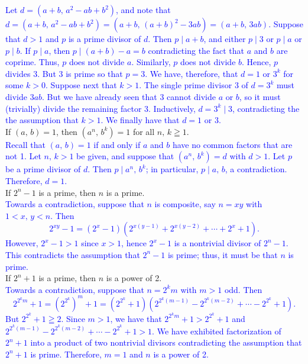 \documentclass[a4paper,11pt]{article}
\theoremstyle{mythm}
\theoremstyle{mydef}
\newcommand{\blue}[1]{\textcolor{blue}{#1}}
\begin{document}
\blue{Let $d=(a+b,\,a^2-ab+b^2)$, and note that
$d=(a+b,\,a^2-ab+b^2)=(a+b,\,(a+b)^2-3ab)=(a+b,\,3ab)$. Suppose that $d>1$ and
$p$ is a prime divisor of $d$. Then $p \mid a+b$, and either $p \mid 3$ or $p
\mid a$ or $p \mid b$. If $p \mid a$, then $p \mid (a+b)-a=b$ contradicting the
fact that $a$ and $b$ are coprime. Thus, $p$ does not divide $a$. Similarly, $p$
does not divide $b$. Hence, $p$ divides 3. But 3 is prime so that $p=3$. We
have, therefore, that $d=1 \text{ or }3^k$ for some $k>0$. Suppose next that
$k>1$. The single prime divisor 3 of $d=3^k$ must divide $3ab$. But we have
already seen that 3 cannot divide $a$ or $b$, so it must (trivially) divide the
remaining factor 3. Inductively, $d=3^k \mid 3$, contradicting the the
assumption that $k>1$. We finally have that $d=1\text{ or }3$.} \\

 If $(a,\,b)=1$, then $(a^n,\,b^k)=1$ for all $n,\,k
\geqq 1$. \\

\blue{Recall that $(a,\,b)=1$ if and only if $a$ and $b$ have no common factors
that are not 1. Let $n,\,k > 1$ be given, and suppose that $(a^n,\,b^k)=d$ with
$d > 1$. Let $p$ be a prime divisor of $d$. Then $p \mid a^n,\,b^k$; in
particular, $p \mid a,\,b$, a contradiction. Therefore, $d=1$.} \\

 If $2^n-1$ is a prime, then $n$ is a prime. \\

\blue{Towards a contradiction, suppose that $n$ is composite, say $n=xy$ with
  $1<x,\,y<n$. Then
  \[
    2^{xy}-1 = (2^x-1)(2^{x(y-1)}+2^{x(y-2)}+\cdots+2^x+1).
  \]
  However, $2^x-1 > 1$ since $x>1$, hence $2^x-1$ is a nontrivial divisor of
  $2^n-1$. This contradicts the assumption that $2^n-1$ is prime; thus, it must be
  that $n$ is prime.} \\

 If $2^n+1$ is a prime, then $n$ is a power of 2. \\

\blue{Towards a contradiction, suppose that $n=2^km$ with $m>1$ odd. Then
  \[
    2^{2^km}+1=(2^{2^k})^m+1 = (2^{2^k}+1)(2^{2^k(m-1)}-2^{2^k(m-2)}+\cdots-2^{2^k}+1).
  \]
  But $2^{2^k}+1 \geqq 2$. Since $m>1$, we have that $2^{2^km}+1 > 2^{2^k}+1$
and $2^{2^k(m-1)}-2^{2^k(m-2)}+\cdots-2^{2^k}+1 > 1$. We have exhibited
factorization of $2^n+1$ into a product of two nontrivial divisors contradicting
the assumption that $2^n+1$ is prime. Therefore, $m=1$ and $n$ is a power of 2.}
\\
\end{document}
